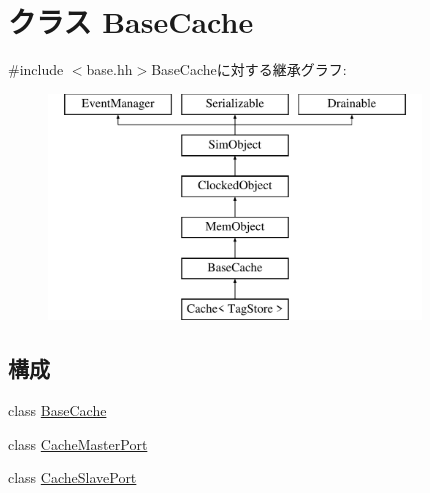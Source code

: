 \hypertarget{classBaseCache}{
\section{クラス BaseCache}
\label{classBaseCache}
}


{\ttfamily \#include $<$base.hh$>$}BaseCacheに対する継承グラフ:\begin{figure}[H]
\begin{center}
\leavevmode
\includegraphics[height=6cm]{classBaseCache}
\end{center}
\end{figure}
\subsection*{構成}
\begin{DoxyCompactItemize}
\item 
class \hyperlink{classBaseCache_1_1BaseCache}{BaseCache}
\item 
class \hyperlink{classBaseCache_1_1CacheMasterPort}{CacheMasterPort}
\item 
class \hyperlink{classBaseCache_1_1CacheSlavePort}{CacheSlavePort}
\end{DoxyCompactItemize}
